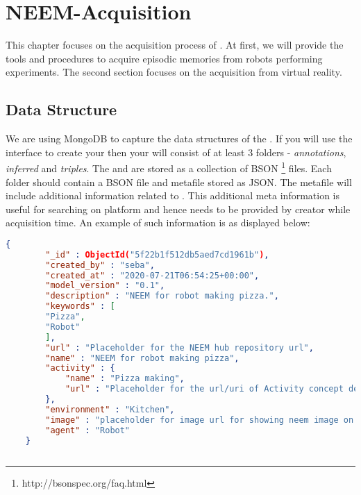 \chapter{NEEM-Acquisition}
\label{ch:acquisition}

This chapter focuses on the acquisition process of \neems.
At first, we will provide the tools and procedures to acquire episodic memories from robots performing experiments.
The second section focuses on the \neem acquisition from virtual reality. 




\section{Data Structure}

We are using MongoDB to capture the data structures of the \neems.
If you will use the \knowrob interface to create your \neems then your \neem will consist of at least 3 folders - \textit{annotations}, \textit{inferred} and \textit{triples}.
The \neemnar and \neemexp are stored as a collection of BSON \footnote{http://bsonspec.org/faq.html} files.
Each folder should contain a BSON file and metafile stored as JSON. The metafile will include additional information related to \neems. This additional meta information is useful for searching \neem on \openease platform and hence needs to be provided by \neem creator while \neem acquisition time. An example of such information is as displayed below:

\begin{lstlisting}[language=json,firstnumber=1]
	{
		"_id" : ObjectId("5f22b1f512db5aed7cd1961b"), 
		"created_by" : "seba",
		"created_at" : "2020-07-21T06:54:25+00:00",
		"model_version" : "0.1",
		"description" : "NEEM for robot making pizza.",
		"keywords" : [	
		"Pizza",
		"Robot"
		],
		"url" : "Placeholder for the NEEM hub repository url",
		"name" : "NEEM for robot making pizza",
		"activity" : {
			"name" : "Pizza making",
			"url" : "Placeholder for the url/uri of Activity concept defined in ontology"    
		},
		"environment" : "Kitchen",
		"image" : "placeholder for image url for showing neem image on openEASE",  
		"agent" : "Robot"
	}
	
\end{lstlisting}

